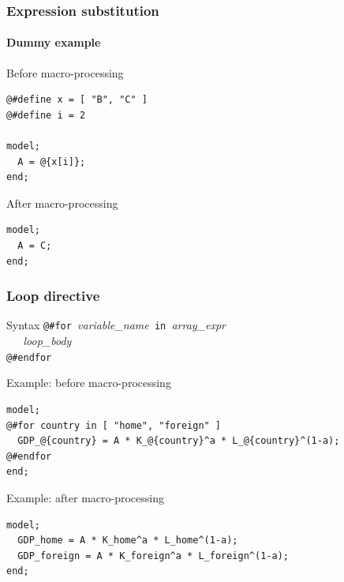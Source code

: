 \documentclass{beamer}
\begin{document}
\begin{frame}[fragile=singleslide]
  \frametitle{Expression substitution}
  \framesubtitle{Dummy example}
  \begin{block}{Before macro-processing}
\begin{verbatim}
@#define x = [ "B", "C" ]
@#define i = 2

model;
  A = @{x[i]};
end;
\end{verbatim}
  \end{block}
  \begin{block}{After macro-processing}
\begin{verbatim}
model;
  A = C;
end;
\end{verbatim}
  \end{block}
\end{frame}

\begin{frame}[fragile=singleslide]
  \frametitle{Loop directive}
  \begin{block}{Syntax}
\verb+@#for +\textit{variable\_name}\verb+ in +\textit{array\_expr} \\
\verb+   +\textit{loop\_body} \\
\verb+@#endfor+
  \end{block}
  \begin{block}{Example: before macro-processing}
    \small
\begin{verbatim}
model;
@#for country in [ "home", "foreign" ]
  GDP_@{country} = A * K_@{country}^a * L_@{country}^(1-a);
@#endfor
end;
\end{verbatim}
    \normalsize
  \end{block}

  \begin{block}{Example: after macro-processing}
    \small
\begin{verbatim}
model;
  GDP_home = A * K_home^a * L_home^(1-a);
  GDP_foreign = A * K_foreign^a * L_foreign^(1-a);
end;
\end{verbatim}
    \normalsize
  \end{block}
\end{frame}
\end{document}
